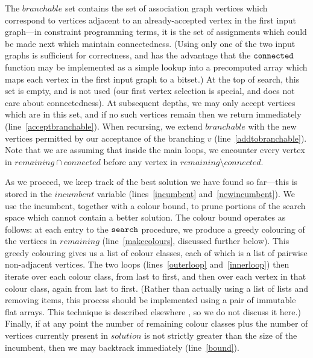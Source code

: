\documentclass{llncs}
\newcommand{\lineref}[1]{line~\ref{#1}}
\newcommand{\twolinesref}[2]{lines~\ref{#1} and~\ref{#2}}
\begin{document}
The $\mathit{branchable}$ set contains the set of association graph vertices which correspond to
vertices adjacent to an already-accepted vertex in the first input graph---in constraint programming terms, it is the
set of assignments which could be made next which maintain connectedness. (Using only one of the two
input graphs is sufficient for correctness, and has the advantage that the $\FuncSty{connected}$
function may be implemented as a simple lookup into a precomputed array which maps each vertex in
the first input graph to a bitset.) At the top of search, this set is empty, and is not used (our
first vertex selection is special, and does not care about connectedness). At subsequent depths, we
may only accept vertices which are in this set, and if no such vertices remain then we return
immediately (\lineref{acceptbranchable}). When recursing, we extend $\mathit{branchable}$ with the
new vertices permitted by our acceptance of the branching $v$ (\lineref{addtobranchable}). Note that
we are assuming that inside the main loops, we encounter every vertex in $\mathit{remaining} \cap
\mathit{connected}$ before any vertex in $\mathit{remaining} \setminus \mathit{connected}$.

As we proceed, we keep track of the best solution we have found so far---this is stored in the
$\mathit{incumbent}$ variable (\twolinesref{incumbent}{newincumbent}). We use the incumbent,
together with a colour bound, to prune portions of the search space which cannot contain a better
solution. The colour bound operates as follows: at each entry to the $\FuncSty{search}$ procedure,
we produce a greedy colouring of the vertices in $\mathit{remaining}$ (\lineref{makecolours},
discussed further below). This greedy colouring gives us a list of colour classes, each of which is
a list of pairwise non-adjacent vertices. The two loops (\twolinesref{outerloop}{innerloop}) then
iterate over each colour class, from last to first, and then over each vertex in that colour class,
again from last to first.  (Rather than actually using a list of lists and removing items, this
process should be implemented using a pair of immutable flat arrays. This technique is described
elsewhere \cite{DBLP:conf/cp/McCreeshP14}, so we do not discuss it here.) Finally, if at any point
the number of remaining colour classes plus the number of vertices currently present in
$\mathit{solution}$ is not strictly greater than the size of the incumbent, then we may backtrack
immediately (\lineref{bound}).
\end{document}
